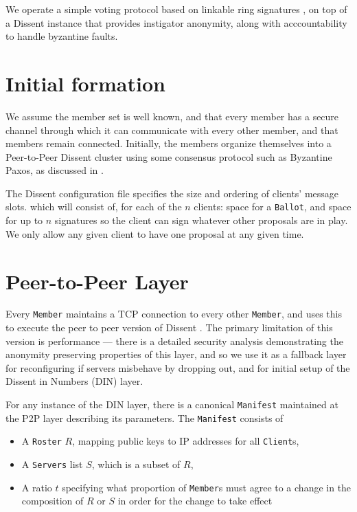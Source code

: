 We operate a simple voting protocol based on linkable ring signatures
\cite{lrs}, on top of a Dissent instance that provides instigator anonymity,
along with acccountability to handle byzantine faults.
\section{Initial formation}
We assume the member set is well known, and that every member has a secure
channel through which it can communicate with every other member, and that
members remain connected. Initially, the
members organize themselves into a Peer-to-Peer Dissent
cluster \cite{p2pd} using some consensus protocol such
as Byzantine Paxos, as discussed in \cite{sec}.

The Dissent configuration file specifies the size and ordering of clients'
message slots. which will
consist of, for each of the $n$ clients: space for a \texttt{Ballot}, and space
for up to $n$ signatures so the client can sign whatever other proposals are in
play.  We only allow any given client to have one proposal at any given time.

\section{Peer-to-Peer Layer}
Every \texttt{Member} maintains a TCP connection to every other \texttt{Member},
and uses this to execute the peer to peer version of Dissent \cite{sec}. The
primary limitation of this version is performance --- there is a detailed
security analysis demonstrating the anonymity preserving properties of this
layer, and so we use it as a fallback layer for reconfiguring if servers
misbehave by dropping out, and for initial setup of the Dissent in Numbers (DIN)
layer.

For any instance of the DIN layer, there is a canonical \texttt{Manifest}
maintained at the P2P layer describing its parameters.  The \texttt{Manifest}
consists of
\begin{itemize}
  \item A \texttt{Roster} $R$, mapping public keys to IP addresses for all
    \texttt{Client}s,
  \item A \texttt{Servers} list $S$, which is a subset of $R$,
  \item A ratio $t$ specifying what proportion of \texttt{Member}s must
    agree to a change in the composition of $R$ or $S$ in order for the change
    to take effect
\end{itemize}

